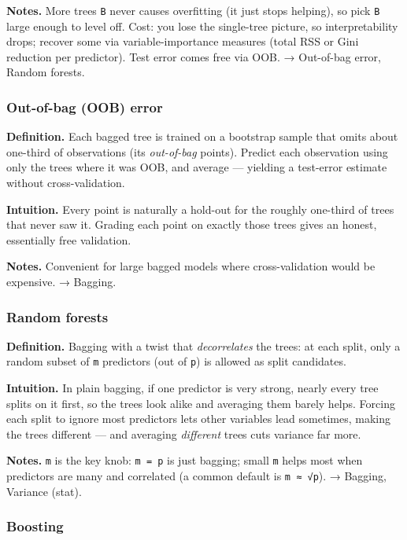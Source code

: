 \documentclass[
  10pt,
  letterpaper,
  onecolumn]{article}
\begin{document}
\textbf{Notes.} More trees \texttt{B} never causes overfitting (it just
stops helping), so pick \texttt{B} large enough to level off. Cost: you
lose the single-tree picture, so interpretability drops; recover some
via variable-importance measures (total RSS or Gini reduction per
predictor). Test error comes free via OOB. → Out-of-bag error, Random
forests.

\hypertarget{out-of-bag-oob-error}{%
\subsubsection{Out-of-bag (OOB) error}\label{out-of-bag-oob-error}}

\textbf{Definition.} Each bagged tree is trained on a bootstrap sample
that omits about one-third of observations (its \emph{out-of-bag}
points). Predict each observation using only the trees where it was OOB,
and average --- yielding a test-error estimate without cross-validation.

\textbf{Intuition.} Every point is naturally a hold-out for the roughly
one-third of trees that never saw it. Grading each point on exactly
those trees gives an honest, essentially free validation.

\textbf{Notes.} Convenient for large bagged models where
cross-validation would be expensive. → Bagging.

\hypertarget{random-forests}{%
\subsubsection{Random forests}\label{random-forests}}

\textbf{Definition.} Bagging with a twist that \emph{decorrelates} the
trees: at each split, only a random subset of \texttt{m} predictors (out
of \texttt{p}) is allowed as split candidates.

\textbf{Intuition.} In plain bagging, if one predictor is very strong,
nearly every tree splits on it first, so the trees look alike and
averaging them barely helps. Forcing each split to ignore most
predictors lets other variables lead sometimes, making the trees
different --- and averaging \emph{different} trees cuts variance far
more.

\textbf{Notes.} \texttt{m} is the key knob: \texttt{m\ =\ p} is just
bagging; small \texttt{m} helps most when predictors are many and
correlated (a common default is \texttt{m\ ≈\ √p}). → Bagging, Variance
(stat).

\hypertarget{boosting}{%
\subsubsection{Boosting}\label{boosting}}
\end{document}
